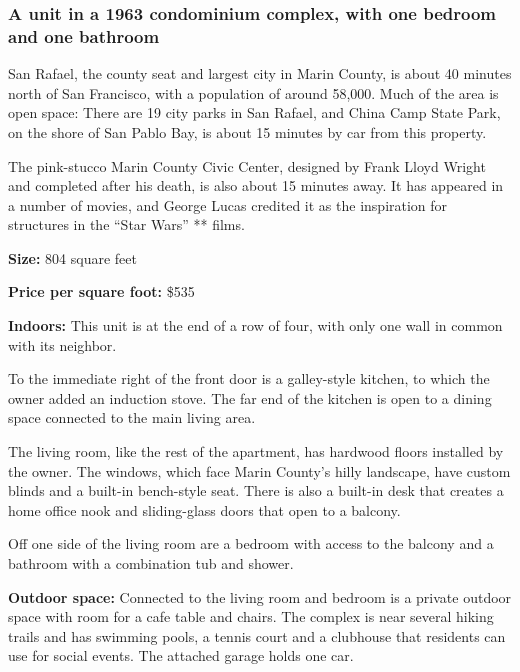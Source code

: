 \hypertarget{a-unit-in-a-1963-condominium-complex-with-one-bedroom-and-one-bathroom}{%
\subsubsection{\texorpdfstring{\textbf{A unit in a 1963 condominium
complex, with one bedroom and one
bathroom}}{A unit in a 1963 condominium complex, with one bedroom and one bathroom}}\label{a-unit-in-a-1963-condominium-complex-with-one-bedroom-and-one-bathroom}}

San Rafael, the county seat and largest city in Marin County, is about
40 minutes north of San Francisco, with a population of around 58,000.
Much of the area is open space: There are 19 city parks in San Rafael,
and China Camp State Park, on the shore of San Pablo Bay, is about 15
minutes by car from this property.

The pink-stucco Marin County Civic Center, designed by Frank Lloyd
Wright and completed after his death, is also about 15 minutes away. It
has appeared in a number of movies, and George Lucas credited it as the
inspiration for structures in the ``Star Wars'' ** films.

\textbf{Size:} 804 square feet

\textbf{Price per square foot:} \$535

\textbf{Indoors:} This unit is at the end of a row of four, with only
one wall in common with its neighbor.

To the immediate right of the front door is a galley-style kitchen, to
which the owner added an induction stove. The far end of the kitchen is
open to a dining space connected to the main living area.

The living room, like the rest of the apartment, has hardwood floors
installed by the owner. The windows, which face Marin County's hilly
landscape, have custom blinds and a built-in bench-style seat. There is
also a built-in desk that creates a home office nook and sliding-glass
doors that open to a balcony.

Off one side of the living room are a bedroom with access to the balcony
and a bathroom with a combination tub and shower.

\textbf{Outdoor space:} Connected to the living room and bedroom is a
private outdoor space with room for a cafe table and chairs. The complex
is near several hiking trails and has swimming pools, a tennis court and
a clubhouse that residents can use for social events. The attached
garage holds one car.

